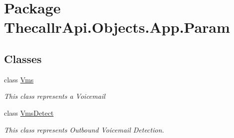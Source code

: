 \hypertarget{namespace_thecallr_api_1_1_objects_1_1_app_1_1_param}{\section{Package Thecallr\+Api.\+Objects.\+App.\+Param}
\label{namespace_thecallr_api_1_1_objects_1_1_app_1_1_param}
}
\subsection*{Classes}
\begin{DoxyCompactItemize}
\item 
class \hyperlink{class_thecallr_api_1_1_objects_1_1_app_1_1_param_1_1_vms}{Vms}
\begin{DoxyCompactList}\small\item\em This class represents a Voicemail \end{DoxyCompactList}\item 
class \hyperlink{class_thecallr_api_1_1_objects_1_1_app_1_1_param_1_1_vms_detect}{Vms\+Detect}
\begin{DoxyCompactList}\small\item\em This class represents Outbound Voicemail Detection. \end{DoxyCompactList}\end{DoxyCompactItemize}

